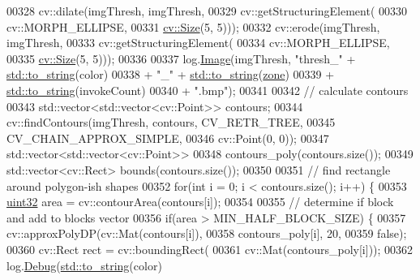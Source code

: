 \begin{DoxyCode}
00328             cv::dilate(imgThresh, imgThresh,
00329                     cv::getStructuringElement(
00330                         cv::MORPH\_ELLIPSE,
00331                         \hyperlink{definitions_8hpp_a9809446fd16a744b6df9808293f14153}{cv::Size}(5, 5)));
00332             cv::erode(imgThresh, imgThresh,
00333                     cv::getStructuringElement(
00334                         cv::MORPH\_ELLIPSE,
00335                         \hyperlink{definitions_8hpp_a9809446fd16a744b6df9808293f14153}{cv::Size}(5, 5)));
00336 
00337             log.\hyperlink{classChipChipArray_1_1Log_a65bbab057c8b1453f9e4efcfee7522c4}{Image}(imgThresh, \textcolor{stringliteral}{"thresh\_"} + \hyperlink{namespacestd_aa5ddf582a1c96ffe258c997be9a294a3}{std::to\_string}(color)
00338                     + \textcolor{stringliteral}{"\_"} + \hyperlink{namespacestd_aa5ddf582a1c96ffe258c997be9a294a3}{std::to\_string}(\hyperlink{classChipChipArray_1_1Grabber_ab57efe6e0b6f369b19528285a278d967}{zone})
00339                     + \hyperlink{namespacestd_aa5ddf582a1c96ffe258c997be9a294a3}{std::to\_string}(invokeCount)
00340                     + \textcolor{stringliteral}{".bmp"});
00341 
00342             \textcolor{comment}{// calculate contours}
00343             std::vector<std::vector<cv::Point>> contours;
00344             cv::findContours(imgThresh, contours, CV\_RETR\_TREE,
00345                     CV\_CHAIN\_APPROX\_SIMPLE,
00346                     cv::Point(0, 0));
00347             std::vector<std::vector<cv::Point>>
00348                 contours\_poly(contours.size());
00349             std::vector<cv::Rect> bounds(contours.size());
00350 
00351             \textcolor{comment}{// find rectangle around polygon-ish shapes}
00352             \textcolor{keywordflow}{for}(\textcolor{keywordtype}{int} i = 0; i < contours.size(); i++) \{
00353                 \hyperlink{definitions_8hpp_a1134b580f8da4de94ca6b1de4d37975e}{uint32} area = cv::contourArea(contours[i]);
00354 
00355                 \textcolor{comment}{// determine if block and add to blocks vector}
00356                 \textcolor{keywordflow}{if}(area > MIN\_HALF\_BLOCK\_SIZE) \{
00357                     cv::approxPolyDP(cv::Mat(contours[i]),
00358                             contours\_poly[i], 20,
00359                             \textcolor{keyword}{false});
00360                     cv::Rect rect = cv::boundingRect(
00361                             cv::Mat(contours\_poly[i]));
00362                     log.\hyperlink{classChipChipArray_1_1Log_ac32b435af1577e4ebc67af2bdfea8eff}{Debug}(\hyperlink{namespacestd_aa5ddf582a1c96ffe258c997be9a294a3}{std::to\_string}(color)

\end{DoxyCode}
